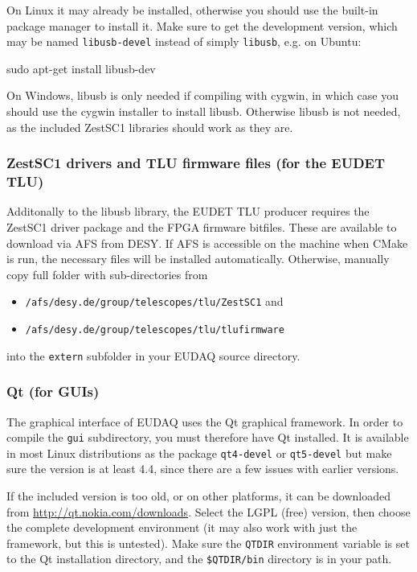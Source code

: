 On Linux it may already be installed,
otherwise you should use the built-in package manager to install it.
Make sure to get the development version, which may be named \texttt{libusb-devel} instead of simply \texttt{libusb}, e.g. on Ubuntu: 
\begin{listing}[mybash]
sudo apt-get install libusb-dev 
\end{listing}

On Windows, libusb is only needed if compiling with cygwin,
in which case you should use the cygwin installer to install libusb.
Otherwise libusb is not needed, as the included ZestSC1 libraries should work as they are.

\subsubsection{ZestSC1 drivers and TLU firmware files (for the EUDET TLU)}
Additonally to the libusb library, the EUDET \gls{TLU} producer requires the
ZestSC1 driver package and the FPGA firmware bitfiles. 
These are available to download via AFS from DESY. 
If AFS is accessible on the machine when CMake is run, the necessary files will be installed
automatically.
Otherwise, manually copy full folder with sub-directories from
\begin{itemize}
\item \texttt{/afs/desy.de/group/telescopes/tlu/ZestSC1} and
\item \texttt{/afs/desy.de/group/telescopes/tlu/tlufirmware}
\end{itemize}
into the \texttt{extern} subfolder in your EUDAQ source directory.


\subsubsection{Qt (for GUIs)}
The graphical interface of EUDAQ uses the Qt graphical framework.
In order to compile the \texttt{gui} subdirectory, you must therefore have Qt installed.
It is available in most Linux distributions as the package \texttt{qt4-devel} or  \texttt{qt5-devel}
but make sure the version is at least 4.4, since there are a few issues with earlier versions.

If the included version is too old, or on other platforms,
it can be downloaded from \url{http://qt.nokia.com/downloads}.
Select the LGPL (free) version, then choose the complete development environment
(it may also work with just the framework, but this is untested).
Make sure the \texttt{QTDIR} environment variable is set to the Qt installation directory,
and the \texttt{\$QTDIR/bin} directory is in your path.

